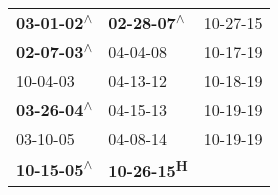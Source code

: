 \begin{supertabular}{lll}
 \textbf{03-01-02\textsuperscript{$\wedge$}} &  \textbf{02-28-07\textsuperscript{$\wedge$}} &  10-27-15\textsuperscript{} \\
 \textbf{02-07-03\textsuperscript{$\wedge$}} &                   04-04-08\textsuperscript{} &  10-17-19\textsuperscript{} \\
                  10-04-03\textsuperscript{} &                   04-13-12\textsuperscript{} &  10-18-19\textsuperscript{} \\
 \textbf{03-26-04\textsuperscript{$\wedge$}} &                   04-15-13\textsuperscript{} &  10-19-19\textsuperscript{} \\
                  03-10-05\textsuperscript{} &                   04-08-14\textsuperscript{} &  10-19-19\textsuperscript{} \\
 \textbf{10-15-05\textsuperscript{$\wedge$}} &         \textbf{10-26-15\textsuperscript{H}} &                             \\
\end{supertabular}
